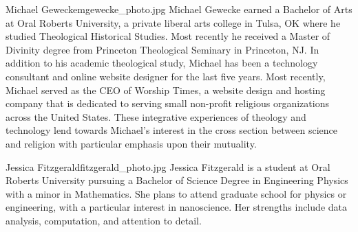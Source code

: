 \begin{authorbio}{Michael Gewecke}{mgewecke_photo.jpg}{}
Michael Gewecke earned a Bachelor of Arts at Oral Roberts University, a private liberal arts college in Tulsa, OK where he studied Theological Historical Studies.  Most recently he received a Master of Divinity degree from Princeton Theological Seminary in Princeton, NJ.  In addition to his academic theological study, Michael has been a technology consultant and online website designer for the last five years.  Most recently, Michael served as the CEO of Worship Times, a website design and hosting company that is dedicated to serving small non-profit religious organizations across the United States.  These integrative experiences of theology and technology lend towards Michael's interest in the cross section between science and religion with particular emphasis upon their mutuality.   
\end{authorbio}

\begin{authorbio}{Jessica Fitzgerald}{fitzgerald_photo.jpg}{}
Jessica Fitzgerald is a student at Oral Roberts University pursuing a Bachelor of Science Degree in Engineering Physics with a minor in Mathematics. She plans to attend graduate school for physics or engineering, with a particular interest in nanoscience. Her strengths include data analysis, computation, and attention to detail.
\end{authorbio}

~


